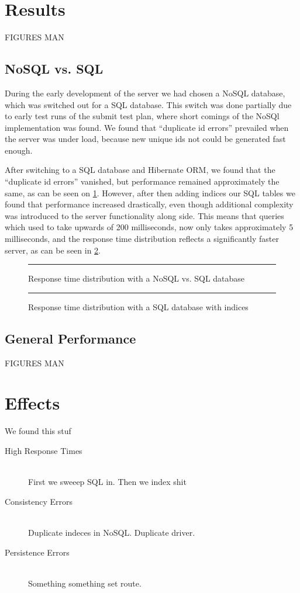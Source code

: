 \section{Results}
FIGURES MAN

\subsection{NoSQL vs. SQL}
During the early development of the server we had chosen a NoSQL database, which was switched out for a SQL database.
This switch was done partially due to early test runs of the submit test plan, where short comings of the NoSQl implementation was found.
We found that \enquote{duplicate id errors} prevailed when the server was under load, because new unique ids not could be generated fast enough.

After switching to a SQL database and Hibernate ORM, we found that the \enquote{duplicate id errors} vanished, but performance remained approximately the same, as can be seen on \cref{fig:same_response_sql}.
However, after then adding indices our SQL tables we found that performance increased drastically, even though additional complexity was introduced to the server functionality along side.
This means that queries which used to take upwards of 200 milliseconds, now only takes approximately 5 milliseconds, and the response time distribution reflects a significantly faster server, as can be seen in \cref{fig:fast_response_indices}.

\begin{figure}[!htb]
    \centering
    \rule{5cm}{5cm}
    \caption{Response time distribution with a NoSQL vs. SQL database}\label{fig:same_response_sql}
\end{figure}

\begin{figure}[!htb]
    \centering
    \rule{5cm}{5cm}
    \caption{Response time distribution with a SQL database with indices}\label{fig:fast_response_indices}
\end{figure}

\subsection{General Performance}
FIGURES MAN

\section{Effects}
We found this stuf
\begin{description}
    \item[High Response Times]\hfill \\
        First we sweeep SQL in. Then we index shit
    \item[Consistency Errors]\hfill \\
        Duplicate indeces in NoSQL. Duplicate driver.
    \item[Persistence Errors]\hfill \\
        Something something set route.
\end{description}
